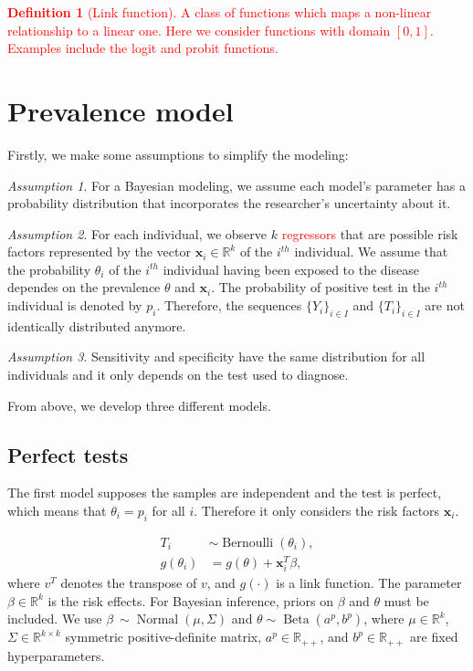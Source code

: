 \documentclass[a4paper, notitlepage, 11pt]{article}
\newcommand{\R}{\mathbb{R}}
\newcommand{\x}{\boldsymbol{x}}
\newcommand{\N}{\operatorname{Normal}}
\newcommand{\betadist}{\operatorname{Beta}}
\newcommand{\bern}{\operatorname{Bernoulli}}
\theoremstyle{definition}
\newtheorem{definition}{Definition}[section]
\theoremstyle{remark}
\newtheorem{assumption}{Assumption}
\newcommand{\improve}[1]{\textcolor{red}{#1}}
\begin{document}
\improve{\begin{definition}[Link function]
  A class of functions which maps a non-linear relationship to a linear one.
  Here we consider functions with domain $[0,1]$. Examples include the logit
  and probit functions.
\end{definition}}

\section{Prevalence model}

Firstly, we make some assumptions to simplify the modeling:

\begin{assumption}  
  For a Bayesian modeling, we assume each model's parameter has a probability distribution that incorporates the researcher's uncertainty about it. 
\end{assumption}

\begin{assumption}
  For each individual, we observe $k$ \improve{regressors} that are possible
  risk factors represented by the vector $\x_i \in \R^{k}$ of the $i^{th}$
  individual. We assume that the probability $\theta_i$ of the $i^{th}$ individual having been exposed
  to the disease dependes on the prevalence $\theta$ and $\x_i$. The
  probability of positive test in the $i^{th}$ individual is denoted by $p_i$. Therefore, the sequences $\{Y_i\}_{i \in I}$ and $\{T_i\}_{i \in I}$ are not
  identically distributed anymore.
\end{assumption}

\begin{assumption}
  Sensitivity and specificity have the same distribution for all
  individuals and it only depends on the test used to diagnose. 
\end{assumption}

From above, we develop three different models.

\subsection{Perfect tests}

The first model supposes the samples are independent and the test is perfect,
which means that $\theta_i = p_i$ for all $i$. Therefore it only considers the risk factors $\x_i$. 

\begin{equation}
  \begin{aligned}
    T_i &\sim \bern(\theta_i), \\
    g(\theta_i) &= g(\theta) + \x_i^T\beta, 
  \end{aligned}  
\end{equation}
where $v^T$ denotes the transpose of $v$, and $g(\cdot)$ is a link function.
The parameter $\beta \in \R^{k}$ is the risk effects. For Bayesian inference, priors on
$\beta$ and $\theta$ must be included. We use $\beta ~ \sim \N(\mu, \Sigma)$
and $\theta \sim \betadist(a^{p}, b^p)$, where $\mu
\in \R^{k}$, $\Sigma \in \R^{k\times k}$ symmetric positive-definite matrix,
$a^p \in \R_{++}$, and $b^p \in \R_{++}$
are fixed hyperparameters. 
\end{document}
